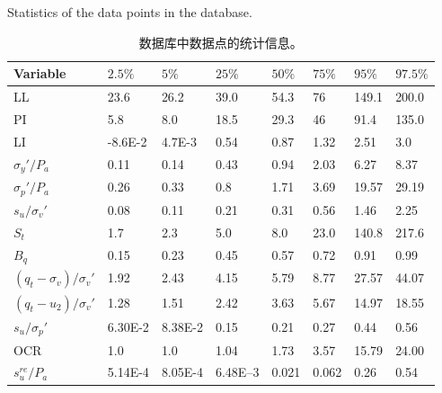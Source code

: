 \begin{table}[!htb]
\begin{minipage}[t]{0.55\textwidth}
        \centering
        \scriptsize
        \caption{Statistics of the data points in the database.}
        \addtocounter{table}{-1}
        \vspace{-8pt}
        \renewcommand{\tablename}{表}
        \caption{数据库中数据点的统计信息。}
        \vspace{4pt}
        \renewcommand{\tablename}{Table}
        \begin{tabular}{llll>{\columncolor{gray}}llll}
            \toprule
            Variable & $2.5\%$ & $5\%$ & $25\%$ & $50\%$ & $75\%$ & $95\%$ & $97.5\%$\\
            \midrule
            LL                          &  23.6    & 26.2      & 39.0      & 54.3  & 76    & 149.1 & 200.0 \\
            PI                          &  5.8     & 8.0       & 18.5      & 29.3  & 46    & 91.4  & 135.0 \\
            LI                          &  -8.6E-2 & 4.7E-3    & 0.54      & 0.87  & 1.32  & 2.51  & 3.0 \\
            $\sigma_y'/P_a$             &  0.11    & 0.14      & 0.43      & 0.94  & 2.03  & 6.27  & 8.37 \\
            $\sigma_p'/P_a$             &  0.26    & 0.33      & 0.8       & 1.71  & 3.69  & 19.57 & 29.19 \\
            $s_u/\sigma_v'$             &  0.08    & 0.11      & 0.21      & 0.31  & 0.56  & 1.46  & 2.25 \\
            $S_t$                       &  1.7     & 2.3       & 5.0       & 8.0   & 23.0  & 140.8 & 217.6 \\
            $B_q$                       &  0.15    & 0.23      & 0.45      & 0.57  & 0.72  & 0.91  & 0.99 \\
            $(q_t-\sigma_v)/\sigma_v'$  &  1.92    & 2.43      & 4.15      & 5.79  & 8.77  & 27.57 & 44.07 \\
            $(q_t-u_2)/\sigma_v'$       &  1.28    & 1.51      & 2.42      & 3.63  & 5.67  & 14.97 & 18.55 \\
            $s_u/\sigma_p'$             &  6.30E-2 & 8.38E-2   & 0.15      & 0.21  & 0.27  & 0.44  & 0.56 \\
            OCR                         &  1.0     & 1.0       & 1.04      & 1.73  & 3.57  & 15.79 & 24.00 \\
            $s_u^{re}/P_a$              &  5.14E-4 & 8.05E-4   & 6.48E–3   & 0.021 & 0.062 & 0.26 &  0.54 \\
            
            \bottomrule
        \end{tabular}%
        \label{table:4}%
    \end{minipage}
\end{table}

